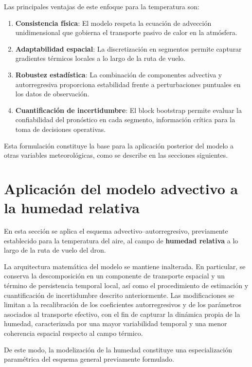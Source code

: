 \documentclass[
  spanish,
  us-letterpaper,
]{scrreprt}
\numberwithin{equation}{section}
\begin{document}
Las principales ventajas de este enfoque para la temperatura son:

\begin{enumerate}
\def\labelenumi{\arabic{enumi}.}
\item
  \textbf{Consistencia física}: El modelo respeta la ecuación de
  advección unidimensional que gobierna el transporte pasivo de calor en
  la atmósfera.
\item
  \textbf{Adaptabilidad espacial}: La discretización en segmentos
  permite capturar gradientes térmicos locales a lo largo de la ruta de
  vuelo.
\item
  \textbf{Robustez estadística}: La combinación de componentes advectiva
  y autorregresiva proporciona estabilidad frente a perturbaciones
  puntuales en los datos de observación.
\item
  \textbf{Cuantificación de incertidumbre}: El block bootstrap permite
  evaluar la confiabilidad del pronóstico en cada segmento, información
  crítica para la toma de decisiones operativas.
\end{enumerate}

Esta formulación constituye la base para la aplicación posterior del
modelo a otras variables meteorológicas, como se describe en las
secciones siguientes.

\section{Aplicación del modelo advectivo a la humedad
relativa}\label{aplicaciuxf3n-del-modelo-advectivo-a-la-humedad-relativa}

En esta sección se aplica el esquema advectivo--autorregresivo,
previamente establecido para la temperatura del aire, al campo de
\textbf{humedad relativa} a lo largo de la ruta de vuelo del dron.

La arquitectura matemática del modelo se mantiene inalterada. En
particular, se conserva la descomposición en un componente de transporte
espacial y un término de persistencia temporal local, así como el
procedimiento de estimación y cuantificación de incertidumbre descrito
anteriormente. Las modificaciones se limitan a la recalibración de los
coeficientes autorregresivos y de los parámetros asociados al transporte
efectivo, con el fin de capturar la dinámica propia de la humedad,
caracterizada por una mayor variabilidad temporal y una menor coherencia
espacial respecto al campo térmico.

De este modo, la modelización de la humedad constituye una
especialización paramétrica del esquema general previamente formulado.
\end{document}
